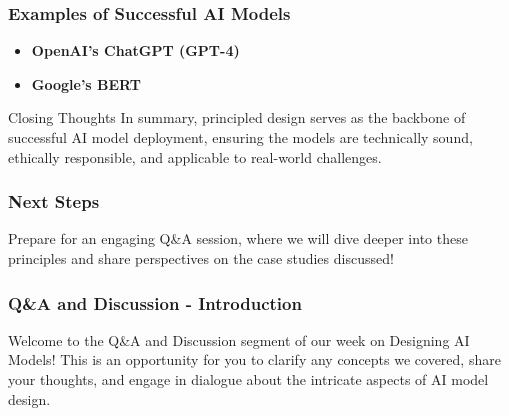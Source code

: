 \documentclass[aspectratio=169]{beamer}
\begin{document}
\begin{frame}[fragile]
    \frametitle{Examples of Successful AI Models}
    \begin{itemize}
        \item \textbf{OpenAI’s ChatGPT (GPT-4)}
        \item \textbf{Google’s BERT}
    \end{itemize}
    \begin{block}{Closing Thoughts}
        In summary, principled design serves as the backbone of successful AI model deployment, ensuring the models are technically sound, ethically responsible, and applicable to real-world challenges.
    \end{block}
\end{frame}

\begin{frame}[fragile]
    \frametitle{Next Steps}
    Prepare for an engaging Q\&A session, where we will dive deeper into these principles and share perspectives on the case studies discussed!
\end{frame}

\begin{frame}[fragile]
    \frametitle{Q\&A and Discussion - Introduction}
    Welcome to the Q\&A and Discussion segment of our week on Designing AI Models! 
    This is an opportunity for you to clarify any concepts we covered, share your thoughts, and engage in dialogue about the intricate aspects of AI model design.
\end{frame}
\end{document}
